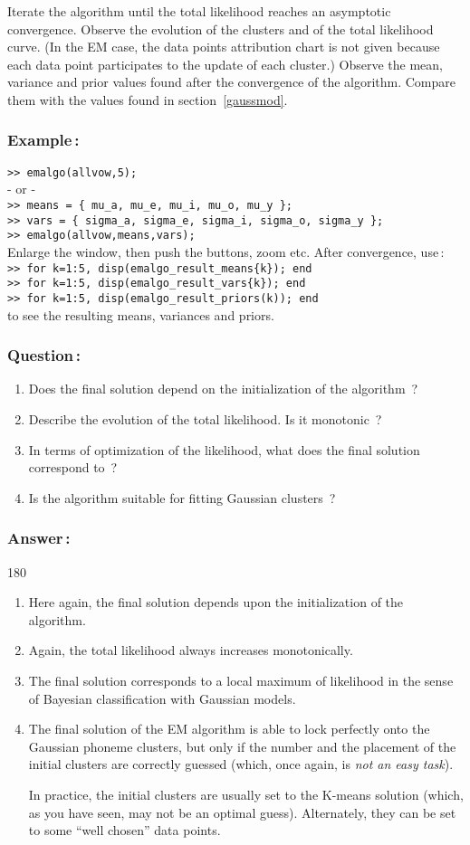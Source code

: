 \documentclass[twoside,a4paper,titlepage]{article}
\newcommand{\mat}[1]{{\tt >> #1} \\}
\newcommand{\expl}[1]{%
\begin{turn}{180}%
\parbox{\textwidth}{\em #1}%
\end{turn}%
}
\newcommand{\tab}{\hspace{1em}}
\begin{document}
Iterate the algorithm until the total likelihood reaches an asymptotic
convergence. Observe the evolution of the clusters and of the total
likelihood curve. (In the EM case, the data points attribution chart is not
given because each data point participates to the update of each cluster.)
Observe the mean, variance and prior values found after the convergence of
the algorithm. Compare them with the values found in
section~\ref{gaussmod}.


\subsubsection*{Example\,:}
\mat{emalgo(allvow,5);}
- or - \\
\mat{means =  \{ mu\_a, mu\_e, mu\_i, mu\_o, mu\_y \};}
\mat{vars = \{ sigma\_a, sigma\_e, sigma\_i, sigma\_o, sigma\_y \};}
\mat{emalgo(allvow,means,vars);}
Enlarge the window, then push the buttons, zoom etc.
After convergence, use\,:\\
\mat{for k=1:5, disp(emalgo\_result\_means\{k\}); end}
\mat{for k=1:5, disp(emalgo\_result\_vars\{k\}); end}
\mat{for k=1:5, disp(emalgo\_result\_priors(k)); end}
to see the resulting means, variances and priors.


\subsubsection*{Question\,:}
\begin{enumerate}
\item Does the final solution depend on the initialization of the
algorithm~?
\item Describe the evolution of the total likelihood. Is it monotonic~?
\item In terms of optimization of the likelihood, what does the final
solution correspond to~?
\item Is the algorithm suitable for fitting Gaussian clusters~?
\end{enumerate}


\subsubsection*{Answer\,:}
\expl{
\begin{enumerate}
\item Here again, the final solution depends upon the initialization
of the algorithm.
\item Again, the total likelihood always increases monotonically.
\item The final solution corresponds to a local maximum of likelihood
in the sense of Bayesian classification with Gaussian models.
\item The final solution of the EM algorithm is able to lock
perfectly onto the Gaussian phoneme clusters, but only if the number and
the placement of the initial clusters are correctly guessed (which, once
again, is {\em not an easy task}).

\tab In practice, the initial clusters are usually set to the K-means
solution (which, as you have seen, may not be an optimal
guess). Alternately, they can be set to some ``well chosen'' data points.
\end{enumerate}
}
\end{document}
